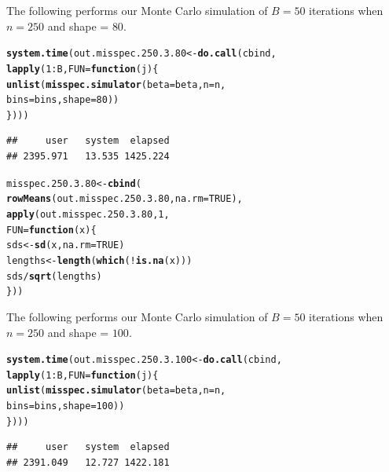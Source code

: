 \documentclass[11pt]{article}\usepackage[]{graphicx}\usepackage[]{color}
\makeatletter
\newcommand{\hlnum}[1]{\textcolor[rgb]{0.686,0.059,0.569}{#1}}%
\newcommand{\hlopt}[1]{\textcolor[rgb]{0,0,0}{#1}}%
\newcommand{\hlstd}[1]{\textcolor[rgb]{0.345,0.345,0.345}{#1}}%
\newcommand{\hlkwa}[1]{\textcolor[rgb]{0.161,0.373,0.58}{\textbf{#1}}}%
\newcommand{\hlkwb}[1]{\textcolor[rgb]{0.69,0.353,0.396}{#1}}%
\newcommand{\hlkwc}[1]{\textcolor[rgb]{0.333,0.667,0.333}{#1}}%
\newcommand{\hlkwd}[1]{\textcolor[rgb]{0.737,0.353,0.396}{\textbf{#1}}}%
\newenvironment{kframe}{%
 \def\at@end@of@kframe{}%
 \ifinner\ifhmode%
  \def\at@end@of@kframe{\end{minipage}}%
  \begin{minipage}{\columnwidth}%
 \fi\fi%
 \def\FrameCommand##1{\hskip\@totalleftmargin \hskip-\fboxsep
 \colorbox{shadecolor}{##1}\hskip-\fboxsep
     \hskip-\linewidth \hskip-\@totalleftmargin \hskip\columnwidth}%
 \MakeFramed {\advance\hsize-\width
   \@totalleftmargin\z@ \linewidth\hsize
   \@setminipage}}%
 {\par\unskip\endMakeFramed%
 \at@end@of@kframe}
\newenvironment{knitrout}{}{} %
\makeatother
\begin{document}
The following performs our Monte Carlo simulation of $B = 50$ iterations 
when $n = 250$ and shape = $80$.

\begin{knitrout}
\color{fgcolor}\begin{kframe}
\begin{alltt}
\hlkwd{system.time}\hlstd{(out.misspec.250.3.80} \hlkwb{<-} \hlkwd{do.call}\hlstd{(cbind,}
  \hlkwd{lapply}\hlstd{(}\hlnum{1}\hlopt{:}\hlstd{B,} \hlkwc{FUN} \hlstd{=} \hlkwa{function}\hlstd{(}\hlkwc{j}\hlstd{)\{}
    \hlkwd{unlist}\hlstd{(}\hlkwd{misspec.simulator}\hlstd{(}\hlkwc{beta} \hlstd{= beta,} \hlkwc{n} \hlstd{= n,}
      \hlkwc{bins} \hlstd{= bins,} \hlkwc{shape} \hlstd{=} \hlnum{80}\hlstd{))}
\hlstd{\})))}
\end{alltt}
\begin{verbatim}
##     user   system  elapsed 
## 2395.971   13.535 1425.224
\end{verbatim}
\end{kframe}
\end{knitrout}

\begin{knitrout}
\color{fgcolor}\begin{kframe}
\begin{alltt}
\hlstd{misspec.250.3.80} \hlkwb{<-} \hlkwd{cbind}\hlstd{(}
  \hlkwd{rowMeans}\hlstd{(out.misspec.250.3.80,} \hlkwc{na.rm} \hlstd{=} \hlnum{TRUE}\hlstd{),}
  \hlkwd{apply}\hlstd{(out.misspec.250.3.80,} \hlnum{1}\hlstd{,}
  \hlkwc{FUN} \hlstd{=} \hlkwa{function}\hlstd{(}\hlkwc{x}\hlstd{)\{}
    \hlstd{sds} \hlkwb{<-} \hlkwd{sd}\hlstd{(x,} \hlkwc{na.rm} \hlstd{=} \hlnum{TRUE}\hlstd{)}
    \hlstd{lengths} \hlkwb{<-} \hlkwd{length}\hlstd{(}\hlkwd{which}\hlstd{(}\hlopt{!}\hlkwd{is.na}\hlstd{(x)))}
    \hlstd{sds} \hlopt{/} \hlkwd{sqrt}\hlstd{(lengths)}
  \hlstd{\}))}
\end{alltt}
\end{kframe}
\end{knitrout}

The following performs our Monte Carlo simulation of $B = 50$ iterations 
when $n = 250$ and shape = $100$.

\begin{knitrout}
\color{fgcolor}\begin{kframe}
\begin{alltt}
\hlkwd{system.time}\hlstd{(out.misspec.250.3.100} \hlkwb{<-} \hlkwd{do.call}\hlstd{(cbind,}
  \hlkwd{lapply}\hlstd{(}\hlnum{1}\hlopt{:}\hlstd{B,} \hlkwc{FUN} \hlstd{=} \hlkwa{function}\hlstd{(}\hlkwc{j}\hlstd{)\{}
    \hlkwd{unlist}\hlstd{(}\hlkwd{misspec.simulator}\hlstd{(}\hlkwc{beta} \hlstd{= beta,} \hlkwc{n} \hlstd{= n,}
      \hlkwc{bins} \hlstd{= bins,} \hlkwc{shape} \hlstd{=} \hlnum{100}\hlstd{))}
\hlstd{\})))}
\end{alltt}
\begin{verbatim}
##     user   system  elapsed 
## 2391.049   12.727 1422.181
\end{verbatim}
\end{kframe}
\end{knitrout}
\end{document}
